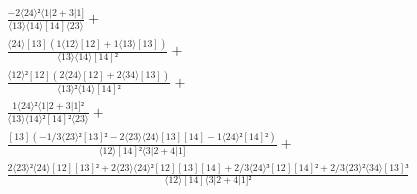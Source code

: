 \documentclass[varwidth, border=5pt]{standalone}
\begin{document}
\begin{my}
$\begin{gathered}
\scriptscriptstyle\frac{-2⟨24⟩²⟨1|2+3|1]}{⟨13⟩⟨14⟩[14]⟨23⟩} +\\
\scriptscriptstyle\frac{⟨24⟩[13](1⟨12⟩[12]+1⟨13⟩[13])}{⟨13⟩⟨14⟩[14]²} +\\
\scriptscriptstyle\frac{⟨12⟩²[12](2⟨24⟩[12]+2⟨34⟩[13])}{⟨13⟩²⟨14⟩[14]²} +\\
\scriptscriptstyle\frac{1⟨24⟩²⟨1|2+3|1]²}{⟨13⟩⟨14⟩²[14]²⟨23⟩} +\\
\scriptscriptstyle\frac{[13](-1/3⟨23⟩²[13]²-2⟨23⟩⟨24⟩[13][14]-1⟨24⟩²[14]²)}{⟨12⟩[14]²⟨3|2+4|1]} +\\
\scriptscriptstyle\frac{2⟨23⟩²⟨24⟩[12][13]²+2⟨23⟩⟨24⟩²[12][13][14]+2/3⟨24⟩³[12][14]²+2/3⟨23⟩²⟨34⟩[13]³}{⟨12⟩[14]⟨3|2+4|1]²} \phantom{+}
\end{gathered}$
\end{my}
\end{document}
